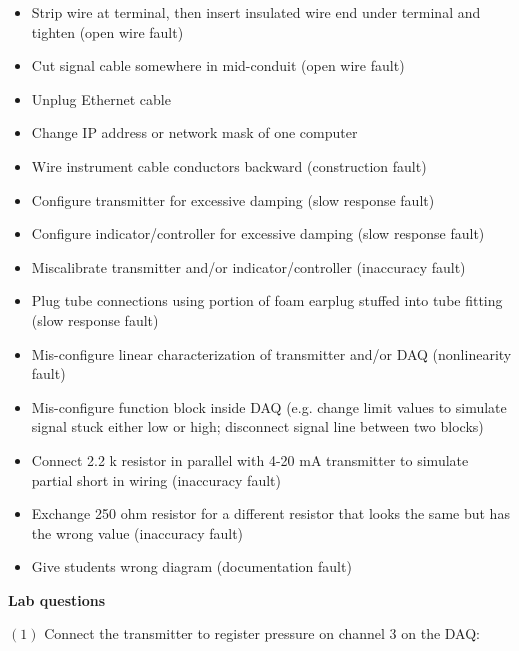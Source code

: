 \begin{itemize}
\goodbreak
\item{} Strip wire at terminal, then insert insulated wire end under terminal and tighten (open wire fault)
\item{} Cut signal cable somewhere in mid-conduit (open wire fault)
\item{} Unplug Ethernet cable
\item{} Change IP address or network mask of one computer
\item{} Wire instrument cable conductors backward (construction fault)
\item{} Configure transmitter for excessive damping (slow response fault)
\item{} Configure indicator/controller for excessive damping (slow response fault)
\item{} Miscalibrate transmitter and/or indicator/controller (inaccuracy fault)
\item{} Plug tube connections using portion of foam earplug stuffed into tube fitting (slow response fault)
\item{} Mis-configure linear characterization of transmitter and/or DAQ (nonlinearity fault)
\item{} Mis-configure function block inside DAQ (e.g. change limit values to simulate signal stuck either low or high; disconnect signal line between two blocks)
\item{} Connect 2.2 k resistor in parallel with 4-20 mA transmitter to simulate partial short in wiring (inaccuracy fault)
\item{} Exchange 250 ohm resistor for a different resistor that looks the same but has the wrong value (inaccuracy fault) 
\item{} Give students wrong diagram (documentation fault)
\end{itemize}















\vfil \eject

\noindent
{\bf Lab questions}

\vskip 20pt

\item{$(1)$} Connect the transmitter to register pressure on channel 3 on the DAQ:

